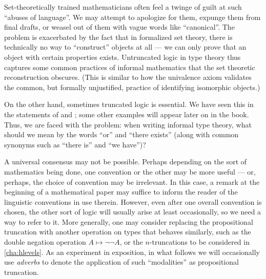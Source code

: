 Set-theoretically trained mathematicians often feel a twinge of guilt at such ``abuses of language''.
We may attempt to apologize for them, expunge them from final drafts, or weasel out of them with vague words like ``canonical''.
The problem is exacerbated by the fact that in formalized set theory, there is technically no way to ``construct'' objects at all --- we can only prove that an object with certain properties exists.
Untruncated logic in type theory thus captures some common practices of informal mathematics that the set theoretic reconstruction obscures.
(This is similar to how the univalence axiom validates the common, but formally unjustified, practice of identifying isomorphic objects.)

On the other hand, sometimes truncated logic is essential.
We have seen this in the statements of \LEM{} and \choice{}; some other examples will appear later on in the book.
Thus, we are faced with the problem: when writing informal type theory, what should we mean by the words ``or'' and ``there exists'' (along with common synonyms such as ``there is'' and ``we have'')?

A universal consensus may not be possible.
Perhaps depending on the sort of mathematics being done, one convention or the other may be more useful --- or, perhaps, the choice of convention may be irrelevant.
In this case, a remark at the beginning of a mathematical paper may suffice to inform the reader of the linguistic conventions in use therein.
However, even after one overall convention is chosen, the other sort of logic will usually arise at least occasionally, so we need a way to refer to it.
More generally, one may consider replacing the propositional truncation with another operation on types that behaves similarly, such as the double negation operation $A\mapsto \neg\neg A$, or the $n$-truncations to be considered in \autoref{cha:hlevels}.
As an experiment in exposition,  in what follows we will occasionally use \emph{adverbs} to denote the application of such ``modalities'' as propositional truncation.

